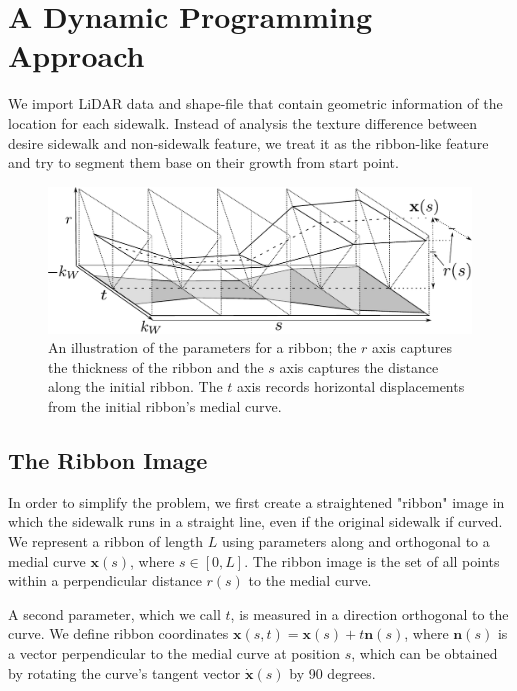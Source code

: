 \chapter{A Dynamic Programming Approach}

We import LiDAR data and shape-file that contain geometric information of the location for each sidewalk. Instead of analysis the texture difference between desire sidewalk and non-sidewalk feature, we treat it as the ribbon-like feature and try to segment them base on their growth from start point. 

\begin{figure}[H]
    \centering
    \includegraphics[width=\textwidth]{Figures/ribbon-3d.pdf}
    \caption[3D Ribbon Image]{An illustration of the parameters for a ribbon; the $r$ axis captures the thickness of the ribbon and the $s$ axis captures the distance along the initial ribbon. The $t$ axis records horizontal displacements from the initial ribbon's medial curve.}
    \label{fig:ribbon_3d}
\end{figure}

\section{The Ribbon Image}

In order to simplify the problem, we first create a straightened "ribbon" image in which the sidewalk runs in a straight line, even if the original sidewalk if curved.
We represent a ribbon of length $L$ using parameters along and orthogonal to a medial curve $\mathbf{x}(s)$, where $s \in [0, L]$. The ribbon image is the set of all points within a perpendicular distance $r(s)$ to the medial curve.

A second parameter, which we call $t$, is measured in a direction orthogonal to the curve.  
We define ribbon coordinates $\mathbf{x}(s, t) = \mathbf{x}(s) + t\mathbf{n}(s)$, where $\mathbf{n}(s)$ is a vector perpendicular to the medial curve at position $s$, which can be obtained by rotating the curve's tangent vector $\dot{\mathbf{x}}(s)$ by 90 degrees. 


